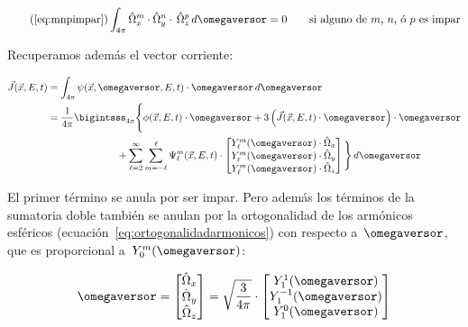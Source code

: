 \begin{equation}\tag{\ref{eq:mnpimpar}}
 \int_{4\pi} \hat{\Omega}_x^m \cdot \hat{\Omega}_y^n \cdot \, \hat{\Omega}_z^p \, d\omegaversor = 0
\quad\quad \text{si alguno de $m$, $n$, ó~$p$ es impar}
\end{equation}

Recuperamos además el vector corriente:



\begin{align*}
 \vec{J}(\vec{x},E,t) &= \int_{4\pi} \psi(\vec{x}, \omegaversor, E, t) \cdot \omegaversor \, d\omegaversor\\
&= \frac{1}{4\pi} \bigintsss_{4\pi} \Bigg\{ \phi(\vec{x}, E,t) \cdot \omegaversor + 3 \left( \vec{J}(\vec{x},E,t) \cdot \omegaversor\right) \cdot \omegaversor \\
& \quad\quad\quad\quad\quad\quad\quad + \sum_{\ell=2}^{\infty} \sum_{m=-\ell}^{\ell} \Psi_\ell^m (\vec{x}, E, t) \cdot 
\begin{bmatrix}
Y_{\ell}^{m} ({\omegaversor}) \cdot \hat\Omega_x \\ 
Y_{\ell}^{m} ({\omegaversor}) \cdot \hat\Omega_y \\
Y_{\ell}^{m} ({\omegaversor}) \cdot \hat\Omega_z
\end{bmatrix}
 \Bigg\} \, d\omegaversor
\end{align*}

\label{pag:argumentoortogonal}
El primer término se anula por ser impar. Pero además los términos de la sumatoria doble también se anulan por la ortogonalidad de los armónicos esféricos (ecuación~\eqref{eq:ortogonalidadarmonicos}) con respecto a~$\omegaversor$, que es proporcional a~$Y_0^m(\omegaversor)$:

\begin{equation}\label{eq:omegapropy}
 \omegaversor = 
\begin{bmatrix}
\hat{\Omega}_x \\
\hat{\Omega}_y \\
\hat{\Omega}_z \\
\end{bmatrix}
=
\sqrt{\frac{3}{4\pi}} \cdot
\begin{bmatrix}
Y_1^{1}(\omegaversor) \\
Y_1^{-1}(\omegaversor) \\
Y_1^{0}(\omegaversor) \\
\end{bmatrix}
\end{equation}

